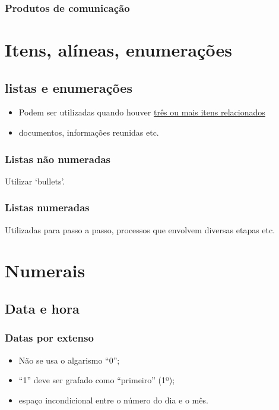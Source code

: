 \subsubsection{Produtos de comunicação}

\section{Itens, alíneas, enumerações}

\subsection{listas e enumerações}

\begin{itemize}
    \item Podem ser utilizadas quando houver \href{https://www.w3.org/TR/wcag-3.0/text-and-wording}{três ou mais itens relacionados}
    \item    documentos, informações reunidas etc.
\end{itemize}

\subsubsection{Listas não numeradas}

Utilizar `bullets'.

\subsubsection{Listas numeradas}
 
Utilizadas para passo a passo, processos que envolvem diversas etapas etc.

\section{Numerais}

\subsection{Data e hora}

\subsubsection{Datas por extenso}

\begin{itemize}
	\item Não se usa o algarismo ``0'';
	\item ``1'' deve ser grafado como ``primeiro'' (1º);
	\item espaço incondicional entre o número do dia e o mês.
\end{itemize}

